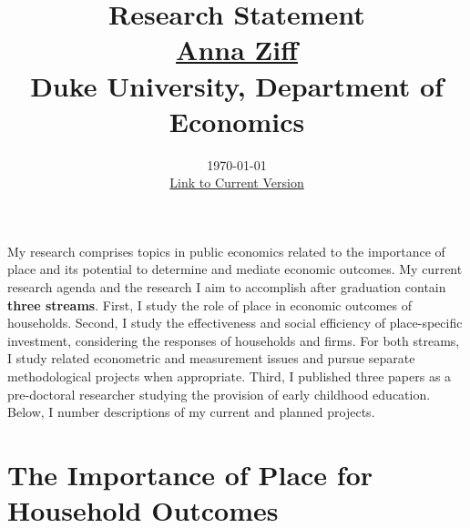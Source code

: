 

\setlength{\parskip}{\baselineskip}%
\setlength{\parindent}{0pt}%
\setlength{\droptitle}{-5em}



\title{\normalsize \textbf{Research Statement} \\ \href{https://aziff.github.io}{Anna Ziff} \\ Duke University, Department of Economics}
\date{\vspace{-2.25cm} \normalsize \today \\ \href{https://www.dropbox.com/scl/fi/cpkgsn0q5n055d53jussa/AnnaZiff_ResearchStatement.pdf?rlkey=ylj2w4sumidwasqk08gfi3p7t&dl=0}{Link to Current Version}}
\maketitle

My research comprises topics in public economics related to the importance of place and its potential to determine and mediate economic outcomes. My current research agenda and the research I aim to accomplish after graduation contain \textbf{three streams}. First, I study the role of place in economic outcomes of households. Second, I study the effectiveness and social efficiency of place-specific investment, considering the responses of households and firms. For both streams, I study related econometric and measurement issues and pursue separate methodological projects when appropriate. Third, I published three papers as a pre-doctoral researcher studying the provision of early childhood education. Below, I number descriptions of my current and planned projects.


\section{The Importance of Place for Household Outcomes}

